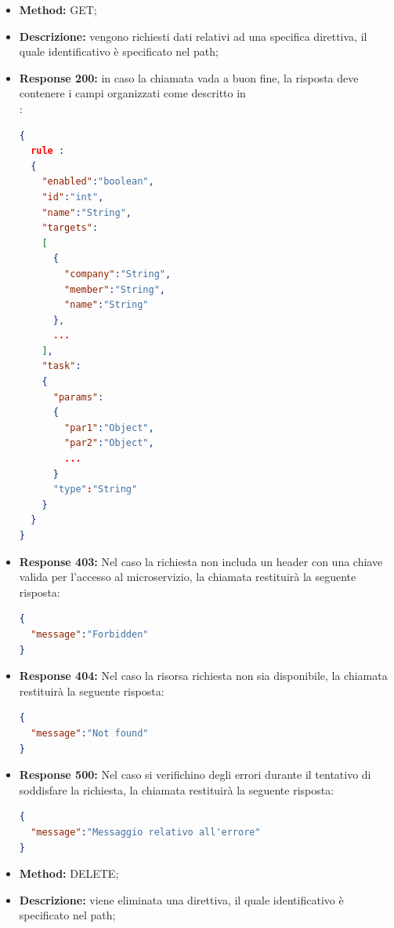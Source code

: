 \begin{itemize}
\begin{itemize}
\item \textbf{Method:} GET;
\item \textbf{Descrizione:} vengono richiesti dati relativi ad una specifica direttiva, il quale identificativo è specificato nel path;
\item \textbf{Response 200:} in caso la chiamata vada a buon fine, la risposta deve contenere i campi organizzati come descritto in \\:
\begin{lstlisting}[language=json,firstnumber=1]
{
  rule :
  {
    "enabled":"boolean",
    "id":"int",
    "name":"String",
    "targets":
    [
      {
        "company":"String",
        "member":"String",
        "name":"String"
      },
      ...
    ],
    "task":
    {
      "params":
      {
        "par1":"Object",
        "par2":"Object",
        ...
      }
      "type":"String"
    }
  }
}
\end{lstlisting}
\item \textbf{Response 403:} Nel caso la richiesta non includa un header  con una chiave valida per l'accesso al microservizio, la chiamata restituirà la seguente risposta:
\begin{lstlisting}[language=json,firstnumber=1]
{
  "message":"Forbidden"
}
\end{lstlisting}

\item \textbf{Response 404:} Nel caso la risorsa richiesta non sia disponibile, la chiamata restituirà la seguente risposta:
\begin{lstlisting}[language=json,firstnumber=1]
{
  "message":"Not found"
}
\end{lstlisting}
\item \textbf{Response 500:} Nel caso si verifichino degli errori durante il tentativo di soddisfare la richiesta, la chiamata restituirà la seguente risposta:
\begin{lstlisting}[language=json,firstnumber=1]
{
  "message":"Messaggio relativo all'errore"
}
\end{lstlisting}
\end{itemize}

\begin{itemize}
\item \textbf{Method:} DELETE;
\item \textbf{Descrizione:} viene eliminata una direttiva, il quale identificativo è specificato nel path;


\end{itemize}
\end{itemize}
